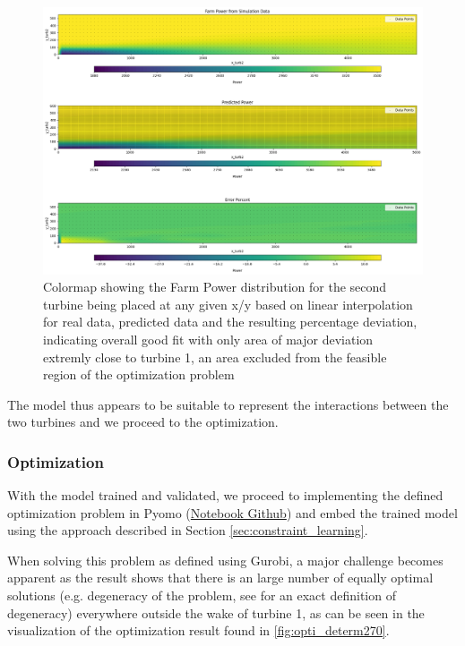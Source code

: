 \begin{figure}[h] 
	\centering
	\includegraphics[width=1\textwidth]{figures/optimization/determ_model_colormap.png} 
	\caption{Colormap showing the Farm Power distribution for the second turbine being placed at any given x/y based on linear interpolation for real data, predicted data and the resulting percentage deviation, indicating overall good fit with only area of major deviation extremly close to turbine 1, an area excluded from the feasible region of the optimization problem }
	\label{fig:determ_model_colormap}
\end{figure}

The model thus appears to be suitable to represent the interactions between the two turbines and we proceed to the optimization.

\subsubsection{Optimization}


With the model trained and validated, we proceed to implementing the defined optimization problem in Pyomo  (\href{https://github.com/schmeti/uc3m_TFM_wind_farm_optimization_codebase/blob/main/Windfarm_power_modelling/0_two_turbine_problem_constrLearn_determin.ipynb}{Notebook Github}) and embed the trained model using the approach described in Section \ref{sec:constraint_learning}.

When solving this problem as defined using Gurobi, a major challenge becomes apparent as the result shows that there is an large number of equally optimal solutions (e.g. degeneracy of the problem, see  \cite{vanderbei2020chapter3} for an exact definition of degeneracy) everywhere outside the wake of turbine 1, as can be seen  in the visualization of the optimization result found in \ref{fig:opti_determ270}.


